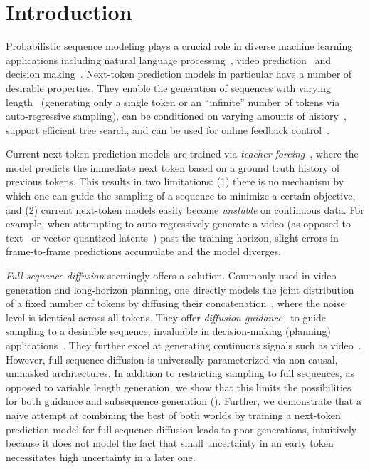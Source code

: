 
\section{Introduction}
Probabilistic sequence modeling plays a crucial role in diverse machine learning applications including natural language processing~\cite{gpt3,peng-etal-2023-rwkv}, video prediction~\cite{ho2022video,yang2023diffusion,flexible_diffusion} and decision making~\cite{openai_dota,dreamer}. 
Next-token prediction models in particular have a number of desirable properties. They enable the generation of sequences with varying length~\cite{10.1162/neco.1997.9.8.1735,818041,DBLP:journals/corr/abs-2006-16236} (generating only a single token or an ``infinite'' number of tokens via auto-regressive sampling), can be conditioned on varying amounts of history~\cite{818041,DBLP:journals/corr/abs-2006-16236}, support efficient tree search\cite{yao2023tree, planet,tdmpc}, and can be used for online feedback control~\cite{dreamer, openai_dota}.

Current next-token prediction models are trained via \emph{teacher forcing}~\cite{teacher_forcing}, where the model predicts the immediate next token based on a ground truth history of previous tokens.
This results in two limitations: (1) there is no mechanism by which one can guide the sampling of a sequence to minimize a certain objective, and
(2) current next-token models easily become \emph{unstable} on continuous data. For example, when attempting to auto-regressively generate a video (as opposed to text~\cite{gpt3} or vector-quantized latents~\cite{hu2023gaia}) past the training horizon, slight errors in frame-to-frame predictions accumulate and the model diverges.

\emph{Full-sequence diffusion} seemingly offers a solution.
Commonly used in video generation and long-horizon planning, one directly models the joint distribution of a fixed number of tokens by diffusing their concatenation~\cite{ho2022video, ajay2022conditional}, where the noise level is identical across all tokens.
They offer \emph{diffusion guidance}~\cite{ho2022classifierfree,dhariwal2021diffusion} to guide sampling to a desirable sequence, invaluable in decision-making (planning) applications~\cite{janner2022planning,huang2023diffusion}. 
They further excel at generating continuous signals such as video~\cite{ho2022video}.
However, full-sequence diffusion is universally parameterized via non-causal, unmasked architectures. 
In addition to restricting sampling to full sequences, as opposed to variable length generation, we show that this limits the possibilities for both guidance and subsequence generation ().
Further, we demonstrate that a naive attempt at combining the best of both worlds by training a next-token prediction model for full-sequence diffusion leads to poor generations, intuitively because it does not model the fact that small uncertainty in an early token necessitates high uncertainty in a later one.

